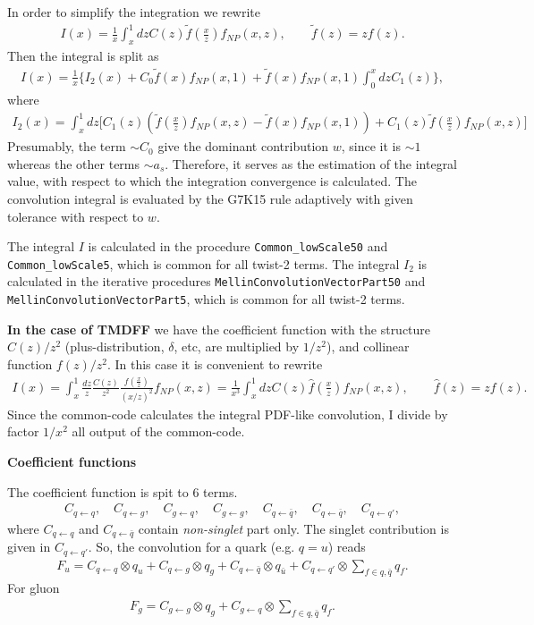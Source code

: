 \documentclass[prd,nofootinbib,eqsecnum,final]{revtex4}
\newcommand{\ot}{\leftarrow}
\renewcommand{\(}{\left(}
\renewcommand{\)}{\right)}
\renewcommand{\[}{\left[}
\renewcommand{\]}{\right]}
\begin{document}
In order to simplify the integration we rewrite
\begin{eqnarray}
I(x)=\frac{1}{x}\int_x^1 dz C(z)\tilde f\(\frac{x}{z}\)f_{NP}(x,z),\qquad \tilde f(z)=zf(z).
\end{eqnarray}
Then the integral is split as
\begin{eqnarray}
I(x)=\frac{1}{x}\Big\{I_2(x)+C_0\tilde f\(x\)f_{NP}(x,1)+\tilde f\(x\)f_{NP}(x,1)\int_0^x dz C_1(z)\Big\},
\end{eqnarray}
where
\begin{eqnarray}
I_2(x)=\int_x^1 dz \Big[C_1(z)\(\tilde f\(\frac{x}{z}\)f_{NP}(x,z)-\tilde f\(x\)f_{NP}(x,1)\)+C_1(z)\tilde f\(\frac{x}{z}\)f_{NP}(x,z)\Big]
\end{eqnarray}
Presumably, the term $\sim C_0$ give the dominant contribution $w$, since it is $\sim 1$ whereas the other terms $\sim a_s$. Therefore, it serves as the estimation of the integral value, with respect to which the integration convergence is calculated. The convolution integral is evaluated by the G7K15 rule adaptively with given tolerance with respect to $w$. 

The integral $I$ is calculated in the procedure \texttt{Common\_lowScale50} and \texttt{Common\_lowScale5}, which is common for all twist-2 terms. The integral $I_2$ is calculated in the iterative procedures \texttt{MellinConvolutionVectorPart50} and \texttt{MellinConvolutionVectorPart5}, which is common for all twist-2 terms. 

\textbf{In the case of TMDFF} we have the coefficient function with the structure $C(z)/z^2$ (plus-distribution, $\delta$, etc, are multiplied by $1/z^2$), and collinear function $f(z)/z^2$. In this case it is convenient to rewrite
\begin{eqnarray}
I(x)=\int_x^1 \frac{dz}{z}\frac{C(z)}{z^2}\frac{f\(\frac{x}{z}\)}{(x/z)^2}f_{NP}(x,z)=\frac{1}{x^3}\int_x^1 dz C(z)\hat f\(\frac{x}{z}\)f_{NP}(x,z),\qquad \hat f(z)=zf(z).
\end{eqnarray}
Since the common-code calculates the integral PDF-like convolution, I divide by factor $1/x^2$ all output of the common-code.

\begin{center}
\textbf{Coefficient functions}
\end{center}

The coefficient function is spit to 6 terms.
\begin{eqnarray}
C_{q\ot q},\quad C_{q\ot g},\quad C_{g\ot q},\quad C_{g\ot g},\quad C_{q\ot \bar q},\quad C_{q\ot \bar q},\quad C_{q\ot q'},
\end{eqnarray}
where $C_{q\ot q}$ and $C_{q\ot \bar q}$ contain \textit{non-singlet} part only. The singlet contribution is given in $C_{q\ot q'}$. So, the convolution for a quark (e.g. $q=u$) reads
\begin{eqnarray}
F_u=C_{q\ot q}\otimes q_u+C_{q\ot g}\otimes q_g+C_{q\ot \bar q}\otimes q_{\bar u}+C_{q\ot q'}\otimes \sum_{f\in q,\bar q} q_f.
\end{eqnarray}
For gluon
\begin{eqnarray}
F_g=C_{g\ot g}\otimes q_g+C_{g\ot q}\otimes \sum_{f\in q,\bar q} q_f.
\end{eqnarray}
\end{document}
